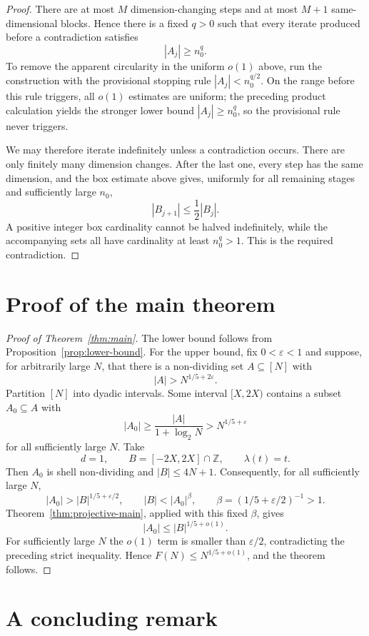 \documentclass[11pt,reqno]{amsart}
\theoremstyle{definition}
\theoremstyle{remark}
\newcommand{\Z}{\mathbb Z}
\begin{document}
\begin{proof}
There are at most $M$ dimension-changing steps and at most $M+1$
same-dimensional blocks.  Hence there is a fixed $q>0$ such that every
iterate produced before a contradiction satisfies
\[
 |A_j|\ge n_0^q.
\]
To remove the apparent circularity in the uniform $o(1)$ above, run the
construction with the provisional stopping rule $|A_j|<n_0^{q/2}$.  On
the range before this rule triggers, all $o(1)$ estimates are uniform;
the preceding product calculation yields the stronger lower bound
$|A_j|\ge n_0^q$, so the provisional rule never triggers.

We may therefore iterate indefinitely unless a contradiction occurs.
There are only finitely many dimension changes.  After the last one, every
step has the same dimension, and the box estimate above gives, uniformly
for all remaining stages and sufficiently large $n_0$,
\[
 |B_{j+1}|\le\frac12|B_j|.
\]
A positive integer box cardinality cannot be halved indefinitely, while
the accompanying sets all have cardinality at least $n_0^q>1$.  This is
the required contradiction.
\end{proof}

\section{Proof of the main theorem}
\label{sec:main-proof}

\begin{proof}[Proof of Theorem~\ref{thm:main}]
The lower bound follows from Proposition~\ref{prop:lower-bound}.  For the
upper bound, fix $0<\varepsilon<1$ and suppose, for arbitrarily large $N$, that
there is a non-dividing set $A\subseteq[N]$ with
\[
 |A|>N^{1/5+2\varepsilon}.
\]
Partition $[N]$ into dyadic intervals.  Some interval $[X,2X)$ contains a
subset $A_0\subseteq A$ with
\[
 |A_0|\ge\frac{|A|}{1+\log_2N}>N^{1/5+\varepsilon}
\]
for all sufficiently large $N$.  Take
\[
 d=1,
 \qquad
 B=[-2X,2X]\cap\Z,
 \qquad
 \lambda(t)=t.
\]
Then $A_0$ is shell non-dividing and $|B|\le4N+1$.  Consequently, for all
sufficiently large $N$,
\[
 |A_0|>|B|^{1/5+\varepsilon/2},
 \qquad
 |B|<|A_0|^{\beta},
 \qquad
 \beta=(1/5+\varepsilon/2)^{-1}>1.
\]
Theorem~\ref{thm:projective-main}, applied with this fixed $\beta$, gives
\[
 |A_0|\le |B|^{1/5+o(1)}.
\]
For sufficiently large $N$ the $o(1)$ term is smaller than
$\varepsilon/2$, contradicting the preceding strict inequality.  Hence
$F(N)\le N^{1/5+o(1)}$, and the theorem follows.
\end{proof}

\section{A concluding remark}
\label{sec:remarks}
\end{document}
